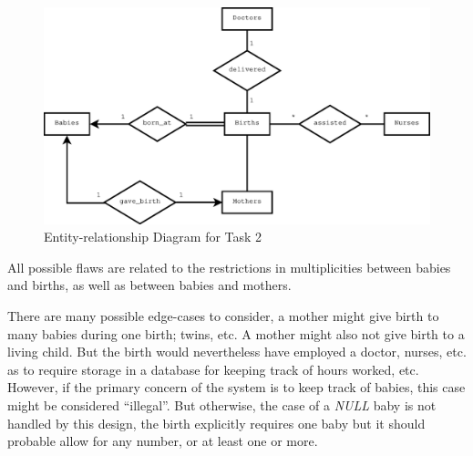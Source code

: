 \begin{figure}[htbp]
  \centering
  \includegraphics[width=\linewidth]{include/task2.eps}
    \caption{Entity-relationship Diagram for Task 2}
  \label{fig:task2}
\end{figure}


All possible flaws are related to the restrictions in multiplicities between
babies and births, as well as between babies and mothers.

There are many possible edge-cases to consider, a mother might give birth to
many babies during one birth; twins, etc.
A mother might also not give birth to a living child. But the birth would
nevertheless have employed a doctor, nurses, etc. as to require storage in a
database for keeping track of hours worked, etc. However, if the primary
concern of the system is to keep track of babies, this case might be considered
``illegal''. But otherwise, the case of a \emph{NULL} baby is not handled by
this design, the birth explicitly requires one baby but it should probable
allow for any number, or at least one or more.
